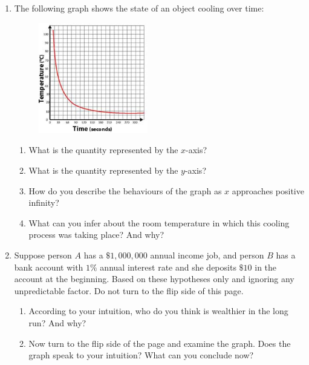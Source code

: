 \documentclass[twoside, 10pt]{article}
\begin{document}
\begin{enumerate}[leftmargin=*]
\item
The following graph shows the state of an object cooling over time:
\begin{figure}[h]
\includegraphics[width=0.45\textwidth]{cooling-law.jpg}
\end{figure}
\begin{enumerate}
\item
What is the quantity represented by the $x$-axis?
\item 
What is the quantity represented by the $y$-axis?
\item 
How do you describe the behaviours of the graph as $x$ approaches positive infinity?
\item
What can you infer about the room temperature in which this cooling process was taking place? And why?
\end{enumerate}
\item
Suppose person $A$ has a $\$1,000,000$ annual income job, and person $B$ has a bank account with $1\%$ annual interest rate and she deposits $\$10$ in the account at the beginning. Based on these hypotheses only and ignoring any unpredictable factor. Do not turn to the flip side of this page.
\begin{enumerate}
\item
According to your intuition, who do you think is wealthier in the long run? And why?
\item Now turn to the flip side of the page and examine the graph. Does the graph speak to your intuition? What can you conclude now?
\clearpage
{}


\end{enumerate}
\end{enumerate}
\end{document}
